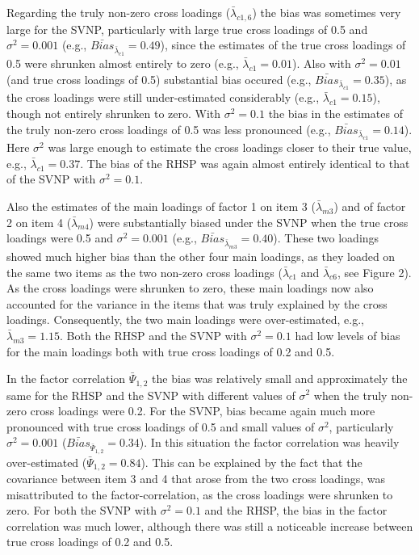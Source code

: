 \documentclass[
  man, donotrepeattitle,floatsintext]{apa6}
\begin{document}
Regarding the truly non-zero cross loadings (\(\bar{\lambda}_{c 1, 6}\))
the bias was sometimes very large for the SVNP, particularly with large
true cross loadings of 0.5 and \(\sigma^2 = 0.001\) (e.g.,
\(\bar{Bias}_{\bar{\lambda}_{c 1}} = 0.49\)), since the estimates of the
true cross loadings of 0.5 were shrunken almost entirely to zero (e.g.,
\(\bar{\lambda}_{c 1} = 0.01\)). Also with \(\sigma^2 = 0.01\) (and true
cross loadings of 0.5) substantial bias occured (e.g.,
\(\bar{Bias}_{\bar{\lambda}_{c 1}} = 0.35\)), as the cross loadings were
still under-estimated considerably (e.g., \(\bar{\lambda}_{c 1} = 0.15\)),
though not entirely shrunken to zero. With \(\sigma^2 = 0.1\) the bias in
the estimates of the truly non-zero cross loadings of 0.5 was less
pronounced (e.g., \(\bar{Bias}_{\bar{\lambda}_{c 1}} = 0.14\)). Here
\(\sigma^2\) was large enough to estimate the cross loadings closer to
their true value, e.g., \(\bar{\lambda}_{c 1} = 0.37\). The bias of the
RHSP was again almost entirely identical to that of the SVNP with
\(\sigma^2 = 0.1\).

Also the estimates of the main loadings of factor 1 on item 3
(\(\bar{\lambda}_{m 3}\)) and of factor 2 on item 4
(\(\bar{\lambda}_{m 4}\)) were substantially biased under the SVNP when
the true cross loadings were 0.5 and \(\sigma^2 = 0.001\) (e.g.,
\(\bar{Bias}_{\bar{\lambda}_{m 3}} = 0.40\)). These two loadings showed
much higher bias than the other four main loadings, as they loaded on
the same two items as the two non-zero cross loadings
(\(\bar{\lambda}_{c 1}\) and \(\bar{\lambda}_{c 6}\), see Figure 2). As the
cross loadings were shrunken to zero, these main loadings now also
accounted for the variance in the items that was truly explained by the
cross loadings. Consequently, the two main loadings were over-estimated,
e.g., \(\bar{\lambda}_{m 3} = 1.15\). Both the RHSP and the SVNP with
\(\sigma^2 = 0.1\) had low levels of bias for the main loadings both with
true cross loadings of 0.2 and 0.5.

In the factor correlation \(\bar{\Psi}_{1,2}\) the bias was relatively
small and approximately the same for the RHSP and the SVNP with
different values of \(\sigma^2\) when the truly non-zero cross loadings
were 0.2. For the SVNP, bias became again much more pronounced with true
cross loadings of 0.5 and small values of \(\sigma^2\), particularly
\(\sigma^2 = 0.001\) (\(\bar{Bias}_{\bar{\Psi}_{1,2}} = 0.34\)). In this
situation the factor correlation was heavily over-estimated
(\(\bar{\Psi}_{1,2} = 0.84\)). This can be explained by the fact that the
covariance between item 3 and 4 that arose from the two cross loadings,
was misattributed to the factor-correlation, as the cross loadings were
shrunken to zero. For both the SVNP with \(\sigma^2 = 0.1\) and the RHSP,
the bias in the factor correlation was much lower, although there was
still a noticeable increase between true cross loadings of 0.2 and 0.5.
\end{document}

